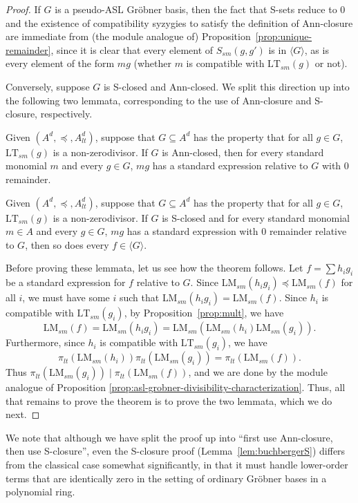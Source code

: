 \documentclass[11pt,reqno]{amsart}
\newcommand{\divides}{\mid}
\newcommand{\lmsm}{\text{LM}_{sm}}
\newcommand{\ltsm}{\text{LT}_{sm}}
\newcommand{\Ssm}{S_{sm}}
\theoremstyle{definition}
\numberwithin{equation}{section}
\begin{document}
\begin{proof}
If $G$ is a pseudo-ASL Gröbner basis, then the fact that S-sets reduce to 0 and the existence of compatibility syzygies to satisfy the definition of Ann-closure are immediate from (the module analogue of) Proposition~\ref{prop:unique-remainder}, since it is clear that every element of $\Ssm(g,g')$ is in $\langle G \rangle$, as is every element of the form $mg$ (whether $m$ is compatible with $\ltsm(g)$ or not).

Conversely, suppose $G$ is S-closed and Ann-closed. We split this direction up into the following two lemmata, corresponding to the use of Ann-closure and S-closure, respectively.

\begin{lemma} \label{lem:buchberger2}
Given $(A^d, \preceq, A_{lt}^d)$, suppose that $G \subseteq A^d$ has the property that for all $g \in G$, $\ltsm(g)$ is a non-zerodivisor. If $G$ is Ann-closed, then for every standard monomial $m$ and every $g \in G$, $mg$ has a standard expression relative to $G$ with 0 remainder.
\end{lemma}

\begin{lemma} \label{lem:buchbergerS}
Given $(A^d, \preceq, A_{lt}^d)$, suppose that $G \subseteq A^d$ has the property that for all $g \in G$, $\ltsm(g)$ is a non-zerodivisor. If $G$ is S-closed and for every standard monomial $m \in A$ and every $g \in G$, $mg$ has a standard expression with 0 remainder relative to $G$, then so does every $f \in \langle G \rangle$.
\end{lemma}

Before proving these lemmata, let us see how the theorem follows. Let $f = \sum h_i g_i$ be a standard expression for $f$ relative to $G$. Since $\lmsm(h_i g_i) \preceq \lmsm(f)$ for all $i$, we must have some $i$ such that $\lmsm(h_i g_i) = \lmsm(f)$. Since $h_i$ is compatible with $\ltsm(g_i)$, by Proposition~\ref{prop:mult}, we have 
\[
\lmsm(f) = \lmsm(h_i g_i) = \lmsm(\lmsm(h_i) \lmsm(g_i)).
\]
Furthermore, since $h_i$ is compatible with $\ltsm(g_i)$, we have 
\[
\pi_{lt}(\lmsm(h_i)) \pi_{lt}(\lmsm(g_i)) = \pi_{lt}(\lmsm(f)).
\]
Thus $\pi_{lt}(\lmsm(g_i)) \divides \pi_{lt}(\lmsm(f))$, and we are done by the module analogue of Proposition \ref{prop:asl-grobner-divisibility-characterization}. Thus, all that remains to prove the theorem is to prove the two lemmata, which we do next.
\end{proof}

\begin{remark}
We note that although we have split the proof up into ``first use Ann-closure, then use S-closure'', even the S-closure proof (Lemma~\ref{lem:buchbergerS}) differs from the classical case somewhat significantly, in that it must handle lower-order terms that are identically zero in the setting of ordinary Gröbner bases in a polynomial ring.
\end{remark}
\end{document}
